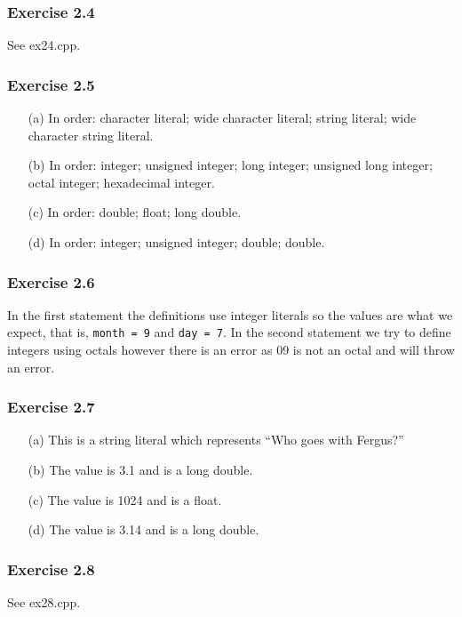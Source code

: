 \documentclass[12pt, a4paper]{article}
\begin{document}
\subsubsection*{Exercise 2.4}
See ex24.cpp.

\subsubsection*{Exercise 2.5}
\begin{itemize}
	\item [(a)]
		In order: character literal; wide character literal; string literal; wide character string literal.
	\item [(b)]
		In order: integer; unsigned integer; long integer; unsigned long integer; octal integer; hexadecimal integer.
	\item [(c)]
		In order: double; float; long double.
	\item [(d)]
		In order: integer; unsigned integer; double; double.
\end{itemize}

\subsubsection*{Exercise 2.6}
In the first statement the definitions use integer literals so the values are what we expect, that is, \texttt{month = 9} and \texttt{day = 7}. In the second statement we try to define integers using octals however there is an error as 09 is not an octal and will throw an error.

\subsubsection*{Exercise 2.7}
\begin{itemize}
	\item [(a)]
		This is a string literal which represents ``Who goes with Fergus?''
	\item [(b)]
		The value is 3.1 and is a long double.
	\item [(c)]
		The value is 1024 and is a float.
	\item [(d)]
		The value is 3.14 and is a long double.
\end{itemize}

\subsubsection*{Exercise 2.8}
See ex28.cpp.
\end{document}
